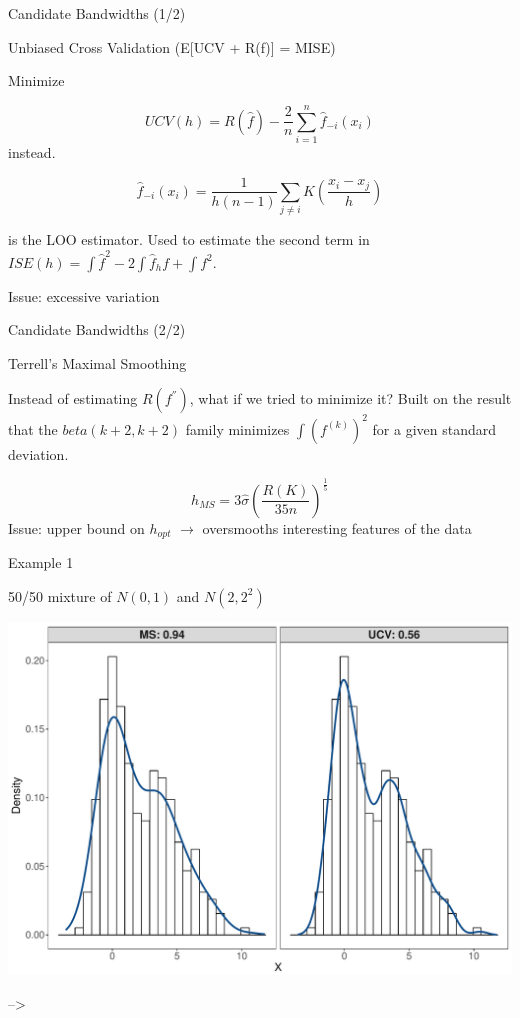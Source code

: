 \documentclass[ignorenonframetext,]{beamer}
\begin{document}
\begin{frame}{Candidate Bandwidths (1/2)}

\begin{block}{Unbiased Cross Validation (E{[}UCV + R(f){]} = MISE)}

Minimize

\[
UCV(h) = R\left(\widehat{f}\right) - \frac{2}{n} \sum_{i = 1}^{n} \widehat{f}_{-i}(x_i)
\] instead.

\[
\widehat{f}_{-i}(x_i) = \frac{1}{h(n-1)}\sum_{j \neq i} K\left(\frac{x_i - x_j}{h}\right)
\]

is the LOO estimator. Used to estimate the second term in
\(ISE(h) = \int \widehat{f}^2 - 2 \int\widehat{f}_h f + \int f^2\).

Issue: excessive variation

\end{block}

\end{frame}

\begin{frame}{Candidate Bandwidths (2/2)}

\begin{block}{Terrell's Maximal Smoothing}

Instead of estimating \(R(f^{''})\), what if we tried to minimize it?
Built on the result that the \(beta(k + 2, k + 2)\) family minimizes
\(\int (f^{(k)})^2\) for a given standard deviation.

\[
h_{MS} =  3 \hat \sigma \left(\frac{R(K)}{35 n} \right)^{\frac{1}{5}}
\] Issue: upper bound on \(h_{opt}\) \(\rightarrow\) oversmooths
interesting features of the data

\end{block}

\end{frame}

\begin{frame}{Example 1}

50/50 mixture of \(N(0,1)\) and \(N(2, 2^2)\)

\includegraphics{ProjectPresentation_files/figure-beamer/unnamed-chunk-2-1.pdf}

--\textgreater{}

\end{frame}
\end{document}

